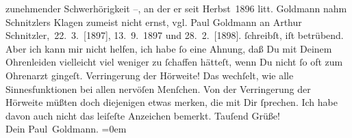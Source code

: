 \begin{ledgroupsized}[t]{13cm}
{{{                  zunehmender Schwerhörigkeit –, an der er seit Herbst 1896 litt. Goldmann nahm Schnitzlers Klagen zumeist nicht ernst, vgl. Paul Goldmann an Arthur Schnitzler, 22. 3. [1897], 13. 9. 1897 und 28. 2. [1898].}}}\label{K_L03092-4h}
               ſchreibſt, iſt betrübend. Aber ich {\pb}kann mir nicht
               helfen, ich habe ſo eine Ahnung, daß  Du mit Deinem Ohrenleiden vielleicht viel weniger zu \strikeout{\textcolor{gray}{×}} ſchaffen hätteſt,
               wenn Du nicht ſo oft zum Ohrenarzt gingeſt. Verringerung der Hörweite!  Das wechſelt, wie alle Sinnesfunktionen bei allen
               nervöſen Menſchen. Von der Verringerung der Hörweite müßten doch diejenigen etwas
               merken, die mit Dir ſprechen. Ich habe davon auch nicht das leiſeſte Anzeichen
               bemerkt.\pend
           \pstart
           Tauſend Grüße! {\\[\baselineskip]}Dein \spacefill\mbox{Paul Goldmann.}\pend
           \leftskip=0em{}
         
         \endnumbering{}\end{ledgroupsized}  \newcommand{\dateiname}{L03092}\newcommand{\titel}{Paul Goldmann an Arthur Schnitzler, 29. 11. [1901]}\newcommand{\editorInnen}{Martin Anton Müller und Laura Untner}
      